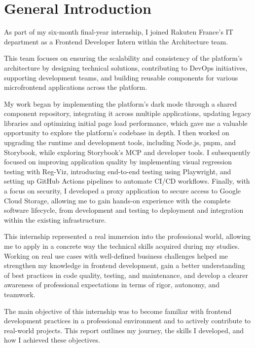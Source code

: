 \chapter*{General Introduction}

\indent As part of my six-month final-year internship, I joined Rakuten France’s IT department as a Frontend Developer Intern within the Architecture team.

This team focuses on ensuring the scalability and consistency of the platform’s architecture by designing technical solutions, contributing to DevOps initiatives, supporting development teams, and building reusable components for various microfrontend applications across the platform. 

My work began by implementing the platform’s dark mode through a shared component repository, integrating it across multiple applications, updating legacy libraries and optimizing initial page load performance, which gave me a valuable opportunity to explore the platform’s codebase in depth. I then worked on upgrading the runtime and development tools, including Node.js, pnpm, and Storybook, while exploring Storybook's MCP and developer tools. I subsequently focused on improving application quality by implementing visual regression testing with Reg-Viz, introducing end-to-end testing using Playwright, and setting up GitHub Actions pipelines to automate CI/CD workflows. Finally, with a focus on security, I developed a proxy application to secure access to Google Cloud Storage, allowing me to gain hands-on experience with the complete software lifecycle, from development and testing to deployment and integration within the existing infrastructure.

This internship represented a real immersion into the professional world, allowing me to apply in a concrete way the technical skills acquired during my studies. Working on real use cases with well-defined business challenges helped me strengthen my knowledge in frontend development, gain a better understanding of best practices in code quality, testing, and maintenance, and develop a clearer awareness of professional expectations in terms of rigor, autonomy, and teamwork.

The main objective of this internship was to become familiar with frontend development practices in a professional environment and to actively contribute to real-world projects. This report outlines my journey, the skills I developed, and how I achieved these objectives.
